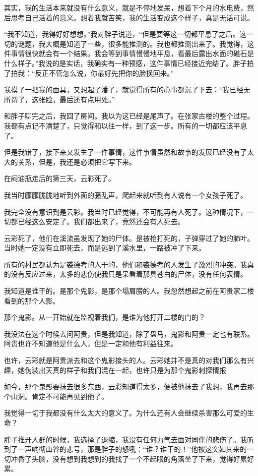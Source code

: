 其实，我的生活本来就没有什么意义，就是不停地发呆，想着下个月的水电费，然后思考自己活着的意义。想着我就苦笑，我的生活变成这个样子，真是无话可说。

“我不知道，我得好好想想。”我对胖子说道，“但是要等这一切都平息了之后。这一切的谜题，我大概是知道了一些，很多能推测的。我也都推测出来了。我觉得，这件事情很快就会有一个结果。我会等到事情慢慢地平息，看最后露出水面的礁石是什么样子。”我说的是实话，我确实有一种预感，这件事情已经接近完结了。胖子拍了拍我：“反正不管怎么说，你最好先把你的脸换回来。”

我摸了一把我的面具，又想起了潘子，就觉得所有的心事都沉了下去：“我已经无所谓了，这张脸，最后还有点用处。”

和胖子聊完之后，我回了房间。我以为这已经是尾声了。在张家古楼的整个过程。我都有点记不清楚了，只觉得和以往一样，到了这一步。所有的一切都应该平息了。

但是我错了，接下来又发生了一件事情，这件亊情虽然和故亊的发展已经没有了太大的关系，但是，我还是必须把它写下来。

在闷油瓶走后的第三天，云彩死了。

我当时朦朦胧胧地听到外面的骚乱声，爬起来就听到有人说有一个女孩子死了。

我完全没有意识到是云彩。我当时已经觉得，不可能再有人死了。这种情况下，一切都已经这么安定了。我们都出来了，竞然还会有人死去。

云彩死了，他们在溪流虽发现了她的尸体。是被枪打死的，子弹穿过了她的肺叶。当时她一定没有立即死去，而是逃到了溪水里，一路被冲了下来。

所有的村民都认为是裘德考的人干的，他们和裘德考的人发生了激烈的冲突。我真的没有反应过来，太多的悲伤使我只是呆看着那具苍白的尸体，没有任何表情。

我知道是谁干的。是那个鬼影，是那个塌肩膀的人。我忽然想起之前在阿贵家二楼看到的那个人影。

那个鬼影。从一开始就在监视着我们，是谁为他打开二楼的门的？

我没法在这个时候去问阿贵，但是我知道，除了盘马，鬼影和阿贵一定也有联系。阿贵也许不知道他是什么人，但是一定和他有利益往来。

也许，云彩就是阿贵派去和这个鬼影接头的人。云彩她并不是真的对我们那么有兴趣，她伪装出天真的样子和我们混在一起，也许只是为那个鬼影刺探情报

如今，那个鬼影要抹去很多东西，云彩知道得太多，便被他抹去了我想，我再去那个山洞。肯定不可能再见到他了。

我觉得一切于我都没有什么太大的意义了。为什么还有人会继续杀害那么可爱的生命？

胖子推开人群的时候，我选择了退缩，我没有任何力气去面对同伴的悲伤了。我听到了一声响彻山谷的悲号，那是胖子的怒吼：“谁？谁干的！”他被这突如其来的一切冲昏了头脑，没有想到我想到的我找了一个不起眼的角落坐了下来，觉得好累好累。

